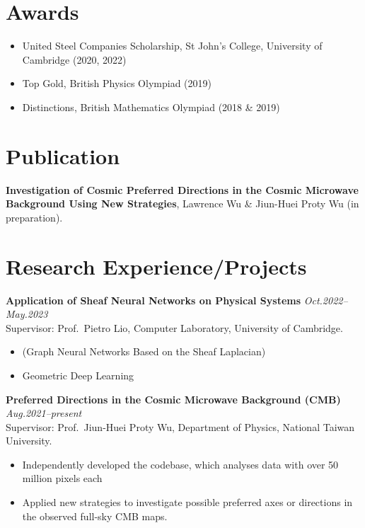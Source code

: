 \documentclass[11pt,a4paper,roman]{moderncv}        %
\begin{document}
\section{Awards}
\begin{itemize}
	\item United Steel Companies Scholarship, St John's College, University of Cambridge (2020, 2022)
	\item Top Gold, British Physics Olympiad (2019)
	\item Distinctions, British Mathematics Olympiad (2018 \& 2019)
\end{itemize}


\section{Publication}
\textbf{Investigation of Cosmic Preferred Directions in the Cosmic Microwave Background Using New Strategies}, Lawrence Wu \& Jiun-Huei Proty Wu (in preparation).

\section{Research Experience/Projects}

\textbf{Application of Sheaf Neural Networks on Physical Systems} \hfill \textit{Oct.2022--May.2023}
\vspace*{1mm}\\
{Supervisor: Prof.\ Pietro Lio, Computer Laboratory, University of Cambridge.}
\vspace*{1mm}
\begin{itemize}
	\item (Graph Neural Networks Based on the Sheaf Laplacian)
	\item Geometric Deep Learning\\
\end{itemize}

\textbf{Preferred Directions in the Cosmic Microwave Background (CMB)} \hfill \textit{Aug.2021--present}
\vspace*{1mm}\\
{Supervisor: Prof.\ Jiun-Huei Proty Wu, Department of Physics, National Taiwan University.}
\vspace*{1mm}
\begin{itemize}
	\item Independently developed the codebase, which analyses data with over 50 million pixels each
	\item Applied new strategies to investigate possible preferred axes or directions in the observed full-sky CMB maps.\\
\end{itemize}
\end{document}

